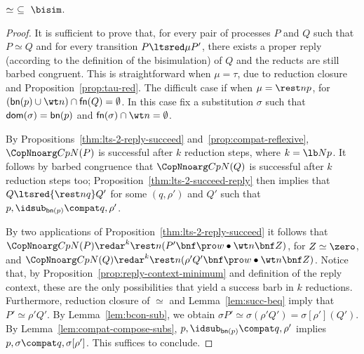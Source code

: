\documentclass{LMCS}
\renewcommand{\beq}{\simeq}
\begin{document}
\begin{thm} 
\label{thm: complete}
$\beq\ \subseteq\ \bisim$.
\end{thm}
\begin{proof}
It is sufficient to prove that, for every pair of processes $P$ and $Q$ such that $P\beq Q$ and
for every transition $P\ltsred\mu P'$, there exists a proper reply (according to the definition of 
the bisimulation) of $Q$ and the reducts are still barbed congruent.
This is straightforward when $\mu = \tau$, due to reduction closure and Proposition~\ref{prop:tau-red}.
The difficult case if when $\mu=\rest n p$, for $({\sf bn}(p)\cup\wt n) \cap {\sf fn}(Q)=\emptyset$.
In this case fix a substitution $\sigma$ such that ${\sf dom}(\sigma)={\sf bn}(p)$ and ${\sf fn}(\sigma)\cap\wt n=\emptyset$.

By Propositions~\ref{thm:lts-2-reply-succeed} and~\ref{prop:compat-reflexive},
$\CopNnoarg C p N (P)$ is successful after $k$ reduction steps, where $k=\lb N p$.
It follows by barbed congruence that $\CopNnoarg C p N (Q)$ is successful after $k$ reduction steps too;
Proposition~\ref{thm:lts-2-succeed-reply} then implies that $Q\ltsred{\rest n q}Q'$
for some $(q,\rho')$ and $Q'$ such that $p,\idsub_{{\sf bn}(p)}\compat q,\rho'$.

By two applications of Proposition~\ref{thm:lts-2-reply-succeed} it follows that
$\CopNnoarg C p N (P)\redar^k \rest n(P'\bnf \pro w\bullet \wt n \bnf Z)$, for $Z \beq \zero$, and
$\CopNnoarg C p N (Q)\redar^k \rest n(\rho'Q'\bnf \pro w\bullet \wt n \bnf Z)$.
Notice that, by Proposition~\ref{prop:reply-context-minimum} and definition of the reply context, 
these are the only possibilities that yield a success barb in $k$ reductions.
Furthermore, reduction closure of $\beq$ and Lemma~\ref{lem:succ-beq} imply that $P'\beq \rho ' Q'$.
By Lemma~\ref{lem:bcon-sub}, we obtain $\sigma P'\beq \sigma (\rho' Q') = \sigma[\rho'](Q')$.
By Lemma~\ref{lem:compat-compose-subs}, $p,\idsub_{{\sf bn}(p)}\compat q,\rho'$ 
implies $p,\sigma\compat q,\sigma[\rho']$. This suffices to conclude.
\end{proof}
\end{document}
